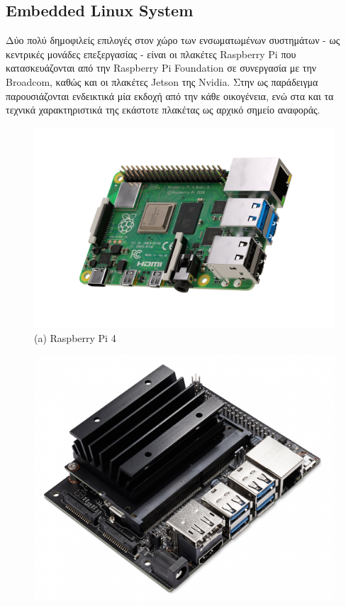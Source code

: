 \subsection{Embedded Linux System}
Δύο πολύ δημοφιλείς επιλογές στον χώρο των ενσωματωμένων συστημάτων - ως κεντρικές μονάδες επεξεργασίας - είναι οι πλακέτες Raspberry Pi που κατασκευάζονται από την Raspberry Pi Foundation σε συνεργασία με την Broadcom, καθώς και οι πλακέτες Jetson της Nvidia. Στην  ως παράδειγμα παρουσιάζονται ενδεικτικά μία εκδοχή από την κάθε οικογένεια, ενώ στα  και  τα τεχνικά χαρακτηριστικά της εκάστοτε πλακέτας ως αρχικό σημείο αναφοράς. 

\begin{figure} [H]
	\centering
    \begin{minipage}{.5\textwidth}
      \centering
      \includegraphics[width=\linewidth]{../Images/Design-Implementation/raspberry-pi-4.png}\\
      {(a) Raspberry Pi 4 }
    \end{minipage}%
    \begin{minipage}{.5\textwidth}
      \centering
      \includegraphics[width=.9\linewidth]{../Images/Design-Implementation/jetson-nano.jpeg}\\

\end{minipage}
\end{figure}

